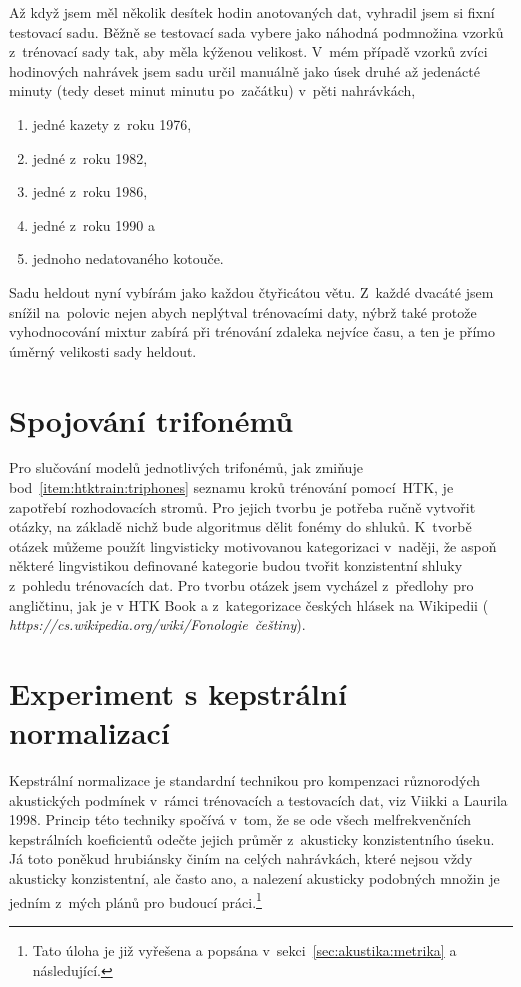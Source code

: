 Až když jsem měl několik desítek hodin anotovaných dat, vyhradil jsem si fixní
testovací sadu. Běžně se testovací sada vybere jako náhodná podmnožina vzorků
z~trénovací sady tak, aby měla kýženou velikost. V~mém případě vzorků zvíci
hodinových nahrávek jsem sadu určil manuálně jako úsek druhé až jedenácté minuty
(tedy deset minut minutu po~začátku) v~pěti nahrávkách,
\begin{enumerate}
\item{jedné kazety z~roku 1976,}
\item{jedné z~roku 1982,}
\item{jedné z~roku 1986,}
\item{jedné z~roku 1990 a}
\item{jednoho nedatovaného kotouče.}
\end{enumerate}

Sadu heldout nyní vybírám jako každou čtyřicátou větu. Z~každé dvacáté jsem
snížil na~polovic nejen abych neplýtval trénovacími daty, nýbrž také protože
vyhodnocování mixtur zabírá při trénování zdaleka nejvíce času, a ten je přímo
úměrný velikosti sady heldout.

\section{Spojování trifonémů}

Pro slučování modelů jednotlivých trifonémů, jak zmiňuje
bod~\ref{item:htktrain:triphones} seznamu kroků trénování pomocí~HTK, je
zapotřebí rozhodovacích stromů. Pro jejich tvorbu je potřeba ručně vytvořit
otázky, na základě nichž bude algoritmus dělit fonémy do shluků. K~tvorbě
otázek můžeme použít lingvisticky motivovanou kategorizaci v~naději, že aspoň
některé lingvistikou definované kategorie budou tvořit konzistentní shluky
z~pohledu trénovacích dat. Pro tvorbu otázek jsem vycházel z~předlohy pro
angličtinu, jak je v HTK Book a z~kategorizace českých hlásek na Wikipedii ({\em
https://cs.wikipedia.org/wiki/Fonologie~češtiny}).

\section{Experiment s kepstrální normalizací}
\label{sec:mfcc-norm}

Kepstrální normalizace je standardní technikou pro kompenzaci různorodých
akustických podmínek v~rámci trénovacích a testovacích dat, viz Viikki a Laurila
1998\cite{viikki1998cepstral}. Princip této techniky spočívá v~tom, že se ode
všech melfrekvenčních kepstrálních koeficientů odečte jejich průměr z~akusticky
konzistentního úseku. Já toto poněkud hrubiánsky činím na celých nahrávkách,
které nejsou vždy akusticky konzistentní, ale často ano, a nalezení akusticky
podobných množin je jedním z~mých plánů pro budoucí práci.\footnote{Tato úloha
je již vyřešena a popsána v~sekci~\ref{sec:akustika:metrika} a následující.}

